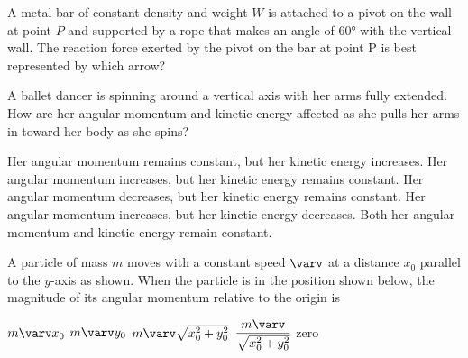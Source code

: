 \documentclass{../../../oss-classkick-exam}
\begin{document}
\begin{multicols*}{2}
\begin{questions}
    \question A metal bar of constant density and weight $W$ is attached to a
    pivot on the wall at point $P$ and supported by a rope that makes an angle
    of \ang{60} with the vertical wall. The reaction force exerted by the pivot
    on the bar at point P is best represented by which arrow?
    \begin{choices}
      \choice{\Large $\nearrow$}
      \choice{\Large $\uparrow$}
      \choice{\Large $\downarrow$}
      \choice{\Large $\nwarrow$}
      \choice{\Large $\searrow$}
    \end{choices}

    \question A ballet dancer is spinning around a vertical axis with her arms
    fully extended. How are her angular momentum and kinetic energy affected
    as she pulls her arms in toward her body as she spins?
    \begin{choices}
      \choice Her angular momentum remains constant, but her kinetic energy
      increases.
      \choice Her angular momentum increases, but her kinetic energy remains
      constant.
      \choice Her angular momentum decreases, but her kinetic energy remains
      constant.
      \choice Her angular momentum increases, but her kinetic energy decreases.
      \choice Both her angular momentum and kinetic energy remain constant.
    \end{choices}
    \vspace{.7in}
    
    \question A particle of mass $m$ moves with a constant speed $\varv$ at a
    distance $x_0$ parallel to the $y$-axis as shown. When the particle is in
    the position shown below, the magnitude of its angular momentum relative to
    the origin is
    \begin{center}
    \end{center}
    \begin{choices}
      \choice $m\varv x_0$
      \choice $m\varv y_0$
      \choice $m\varv\sqrt{x_0^2+y_0^2}$
      \choice $\dfrac{m\varv}{\sqrt{x_0^2+y_0^2}}$
      \choice zero
    \end{choices}
    

\end{questions}
\end{multicols*}
\end{document}

